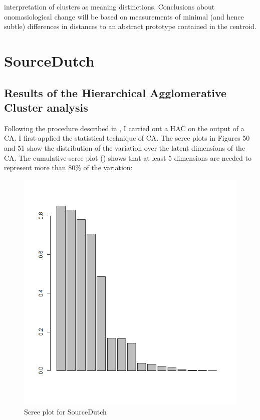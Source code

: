 interpretation of clusters as meaning distinctions. Conclusions about onomasiological change will be based on measurements of minimal (and hence subtle) differences in distances to an abstract prototype contained in the centroid. 

\section{SourceDutch}
\label{sec:4.2}  
\subsection{Results of the Hierarchical Agglomerative Cluster analysis}
\label{sec:4.2.1}  
Following the procedure described in , I carried out a HAC on the output of a CA. I first applied the statistical technique of CA. The scree plots in Figures 50 and 51 show the distribution of the variation over the latent dimensions of the CA. The cumulative scree plot () shows that at least 5 dimensions are needed to represent more than 80\% of the variation:

\begin{figure}
\includegraphics[height=.4\textheight]{figures/Vandevoorde2-img50.png}
\caption{\label{fig:4:50}  Scree plot for SourceDutch}
\end{figure}

